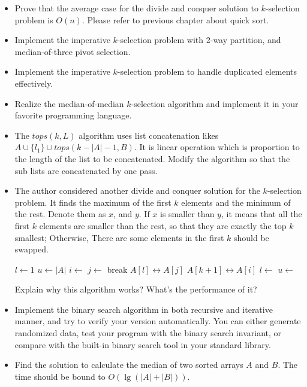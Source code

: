 \documentclass[UTF8]{article}
\begin{document}
\begin{Exercise}
\begin{itemize}
\item Prove that the average case for the divide and conquer solution to $k$-selection problem is $O(n)$. Please refer to previous chapter about quick sort.
\item Implement the imperative $k$-selection problem with 2-way partition, and median-of-three pivot selection.
\item Implement the imperative $k$-selection problem to handle duplicated elements effectively.
\item Realize the median-of-median $k$-selection algorithm and implement it in your favorite programming language.
\item The $tops(k, L)$ algorithm uses list concatenation likes $A \cup \{ l_1 \} \cup tops(k - |A| - 1, B)$. It is linear operation which is proportion to the length of the list to be concatenated. Modify the algorithm so that the sub lists are concatenated by one pass.
\item The author considered another divide and conquer solution for the $k$-selection problem. It finds the maximum of the
first $k$ elements and the minimum of the rest. Denote them as $x$, and $y$. If $x$ is smaller than $y$, it means that
all the first $k$ elements are smaller than the rest, so that they are exactly the top $k$ smallest; Otherwise, There are
some elements in the first $k$ should be swapped.
\begin{algorithmic}[1]
  \State $l \gets 1$
  \State $u \gets |A|$
  \Loop
    \State $i \gets$ 
    \State $j \gets$ 
      \State break
    \EndIf
    \State {} $A[l] \leftrightarrow A[j]$
    \State {} $A[k+1] \leftrightarrow A[i]$
    \State $l \gets$ 
    \State $u \gets$ 
  \EndLoop
\EndProcedure
\end{algorithmic}
Explain why this algorithm works? What's the performance of it?
\item Implement the binary search algorithm in both recursive and iterative manner, and try to verify your version
automatically. You can either generate randomized data, test your program with the binary search invariant, or compare with the built-in binary search tool in your standard library.
\item Find the solution to calculate the median of two sorted arrays $A$ and $B$. The time should be bound to $O(\lg (|A| + |B|))$.

\end{itemize}
\end{Exercise}
\end{document}
